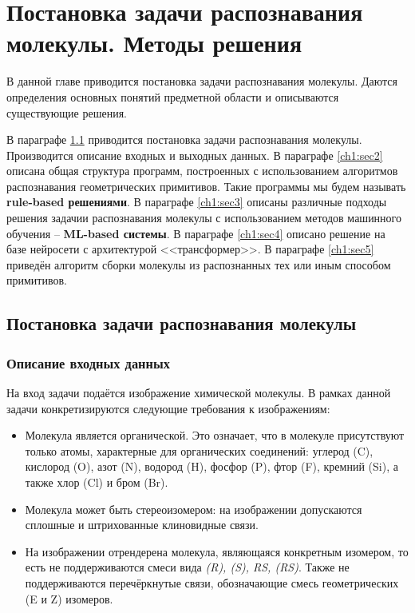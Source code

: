 \chapter{Постановка задачи распознавания молекулы. Методы решения} \label{ch1}

В данной главе приводится постановка задачи распознавания молекулы. Даются определения основных понятий предметной области и описываются существующие решения.

В параграфе \ref{ch1:sec1} приводится постановка задачи распознавания молекулы. Производится описание входных и выходных данных. В параграфе \ref{ch1:sec2} описана общая структура программ, построенных с использованием алгоритмов распознавания геометрических примитивов. Такие программы мы будем называть \textbf{rule-based решениями}. В параграфе \ref{ch1:sec3} описаны различные подходы решения задачии распознавания молекулы с использованием методов машинного обучения -- \textbf{ML-based системы}. В параграфе \ref{ch1:sec4} описано решение на базе нейросети с архитектурой <<трансформер>>. В параграфе \ref{ch1:sec5} приведён алгоритм сборки молекулы из распознанных тех или иным способом примитивов.

\section{Постановка задачи распознавания молекулы} \label{ch1:sec1}
\subsection{Описание входных данных}
На вход задачи подаётся изображение химической молекулы. В рамках данной задачи конкретизируются следующие требования к изображениям:
\begin{itemize}
	\item Молекула является органической. Это означает, что в молекуле присутствуют только атомы, характерные для органических соединений: углерод (C), кислород (O), азот (N), водород (H), фосфор (P), фтор (F), кремний (Si), а также хлор (Cl) и бром (Br).
	\item Молекула может быть стереоизомером: на изображении допускаются сплошные и штрихованные клиновидные связи.
	\item На изображении отрендерена молекула, являющаяся конкретным изомером, то есть не поддерживаются смеси вида \textit{(R), (S), RS, (RS)}. Также не поддерживаются перечёркнутые связи, обозначающие смесь геометрических (E и Z) изомеров.
\end{itemize}

